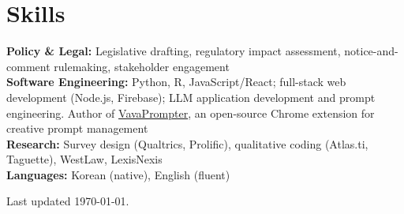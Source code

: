 \documentclass[10pt]{article}
\begin{document}
\section*{Skills}
{\small
\textbf{Policy \& Legal:} Legislative drafting, regulatory impact assessment, notice-and-comment rulemaking, stakeholder engagement\\
\textbf{Software Engineering:} Python, R, JavaScript/React; full-stack web development (Node.js, Firebase); LLM application development and prompt engineering. Author of \href{https://github.com/inyoungcheong/vavaprompter}{VavaPrompter}, an open-source Chrome extension for creative prompt management\\
\textbf{Research:} Survey design (Qualtrics, Prolific), qualitative coding (Atlas.ti, Taguette), WestLaw, LexisNexis\\
\textbf{Languages:} Korean (native), English (fluent)
}

\vfill
{\scriptsize Last updated \today.}
\end{document}
